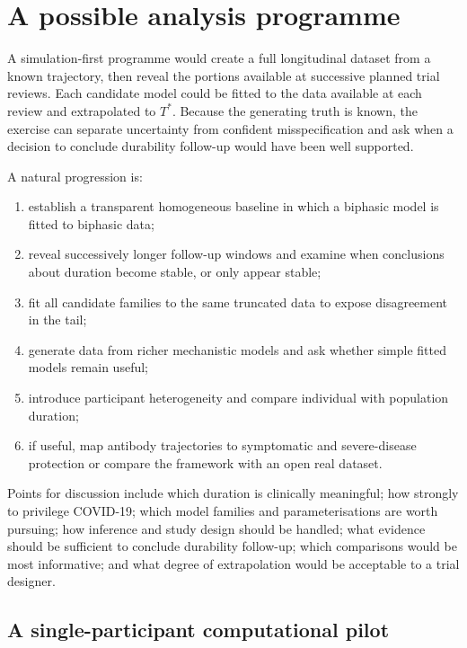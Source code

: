 \documentclass[11pt,a4paper]{article}
\begin{document}
\section{A possible analysis programme}\label{sec:analysis}

A simulation-first programme would create a full longitudinal dataset from a known trajectory,
then reveal the portions available at successive planned trial reviews. Each candidate model could
be fitted to the data available at each review and extrapolated to $T^*$. Because the generating
truth is known, the exercise can separate uncertainty from confident misspecification and ask when
a decision to conclude durability follow-up would have been well supported.

A natural progression is:
\begin{enumerate}
  \item establish a transparent homogeneous baseline in which a biphasic model is fitted to
        biphasic data;
  \item reveal successively longer follow-up windows and examine when conclusions about duration
        become stable, or only appear stable;
  \item fit all candidate families to the same truncated data to expose disagreement in the tail;
  \item generate data from richer mechanistic models and ask whether simple fitted models remain
        useful;
  \item introduce participant heterogeneity and compare individual with population duration;
  \item if useful, map antibody trajectories to symptomatic and severe-disease protection or
        compare the framework with an open real dataset.
\end{enumerate}

Points for discussion include which duration is clinically meaningful; how strongly to privilege
COVID-19; which model families and parameterisations are worth pursuing; how inference and study
design should be handled; what evidence should be sufficient to conclude durability follow-up;
which comparisons would be most informative; and what degree of extrapolation would be acceptable
to a trial designer.

\subsection*{A single-participant computational pilot}
\end{document}
